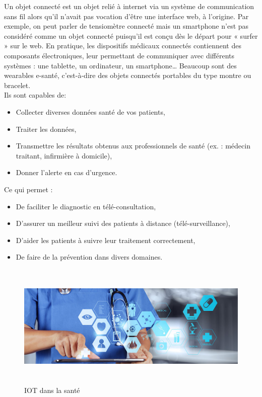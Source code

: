 \documentclass[12pt]{article}
\begin{document}
Un objet connecté est un objet relié à internet via un système de communication sans fil alors qu’il n’avait pas vocation d’être une interface web, à l’origine. Par exemple, on peut parler de tensiomètre connecté mais un smartphone n’est pas considéré comme un objet connecté puisqu’il est conçu dès le départ pour « surfer » sur le web. En pratique, les dispositifs médicaux connectés contiennent des composants électroniques, leur permettant de communiquer avec différents systèmes : une tablette, un ordinateur, un smartphone… Beaucoup sont des wearables e-santé, c’est-à-dire des objets connectés portables du type montre ou bracelet.\\
Ils sont capables de:
\begin{itemize}
	\item Collecter diverses données santé de vos patients,
	\item Traiter les données,
	\item Transmettre les résultats obtenus aux professionnels de santé (ex. : médecin traitant, infirmière à domicile),
	\item Donner l’alerte en cas d’urgence.
\end{itemize}
Ce qui permet :
\begin{itemize}
	\item De faciliter le diagnostic en télé-consultation,
	\item D’assurer un meilleur suivi des patients à distance (télé-surveillance),
	\item D’aider les patients à suivre leur traitement correctement,
	\item De faire de la prévention dans divers domaines.
\end{itemize}
\begin{figure}[h]
	\centering
	\includegraphics[height=6cm, width=15cm]{img-Chapiter-2/IOT.jpg}
	\caption{ IOT dans la santé}
\end{figure}
\end{document}
